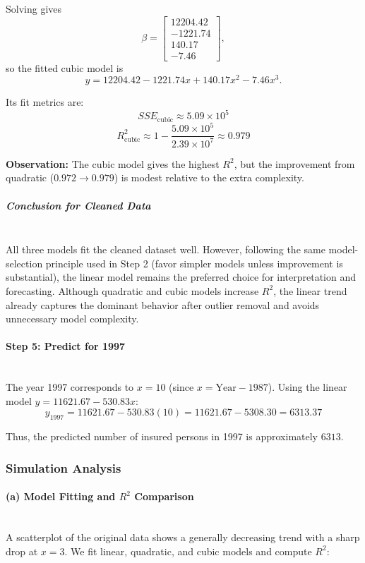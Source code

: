 Solving gives
\[
\beta =
\begin{bmatrix}
12204.42 \\
-1221.74 \\
140.17 \\
-7.46
\end{bmatrix},
\]
so the fitted cubic model is
\[
\hat{y} = 12204.42 - 1221.74x + 140.17x^2 - 7.46x^3.
\]

Its fit metrics are:
\[
SSE_{\text{cubic}} \approx 5.09 \times 10^5
\]
\[
R^2_{\text{cubic}} \approx 1 - \frac{5.09 \times 10^5}{2.39 \times 10^7} \approx 0.979
\]

\textbf{Observation:} The cubic model gives the highest $R^2$, but the improvement from quadratic ($0.972 \to 0.979$) is modest relative to the extra complexity.

\subparagraph{Conclusion for Cleaned Data} \mbox{} \\
All three models fit the cleaned dataset well. However, following the same model-selection principle used in Step 2 (favor simpler models unless improvement is substantial), the linear model remains the preferred choice for interpretation and forecasting. Although quadratic and cubic models increase $R^2$, the linear trend already captures the dominant behavior after outlier removal and avoids unnecessary model complexity.

\paragraph{Step 5: Predict for 1997} \mbox{} \\
The year 1997 corresponds to $x=10$ (since $x=\text{Year}-1987$).
Using the linear model $y = 11621.67 - 530.83x$:
\[
y_{1997} = 11621.67 - 530.83(10) = 11621.67 - 5308.30 = 6313.37
\]

Thus, the predicted number of insured persons in 1997 is approximately $\boxed{6313}$.

\subsubsection{Simulation Analysis}

\paragraph{(a) Model Fitting and $R^2$ Comparison} \mbox{} \\
A scatterplot of the original data shows a generally decreasing trend with a sharp drop at $x=3$. We fit linear, quadratic, and cubic models and compute $R^2$:

